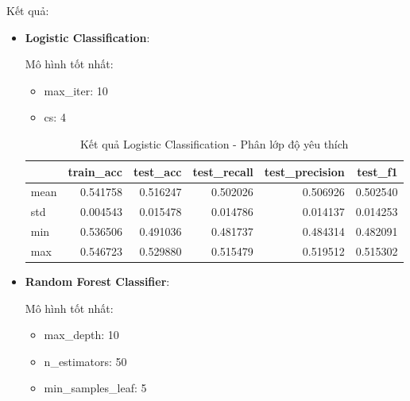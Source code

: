     Kết quả:

    \begin{itemize}
        \item \textbf{Logistic Classification}: 
        
            Mô hình tốt nhất:
            \begin{itemize}
                \item max\_iter: 10
                \item cs: 4
            \end{itemize}

            \begin{table}[htbp]
            \centering
            \caption{Kết quả Logistic Classification - Phân lớp độ yêu thích}
            \label{tab:mal-fav-LogCV}
            \begin{tabular}{lrrrrr}
                \hline
                & train\_acc & test\_acc & test\_recall & test\_precision & test\_f1 \\
                \hline
                mean & 0.541758 & 0.516247 & 0.502026 & 0.506926 & 0.502540 \\
                std & 0.004543 & 0.015478 & 0.014786 & 0.014137 & 0.014253 \\
                min & 0.536506 & 0.491036 & 0.481737 & 0.484314 & 0.482091 \\
                max & 0.546723 & 0.529880 & 0.515479 & 0.519512 & 0.515302 \\
                \hline
            \end{tabular}
            \end{table}
  
            
            \FloatBarrier
            
        \item \textbf{Random Forest Classifier}:

            Mô hình tốt nhất:
            \begin{itemize}
                \item max\_depth: 10
                \item n\_estimators: 50
                \item min\_samples\_leaf: 5
            \end{itemize}


\end{itemize}
